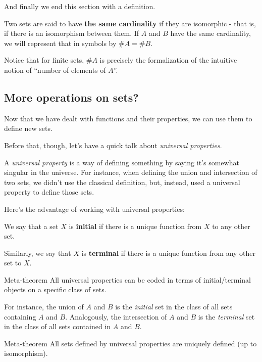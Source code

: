 And finally we end this section with a definition.

\begin{df}
	Two sets are said to have \textbf{the same cardinality} if they are isomorphic - that is, if there is an isomorphism between them. If $A$ and $B$ have the same cardinality, we will represent that in symbols by $\#A=\#B$.
\end{df}

\begin{rmk}
	Notice that for finite sets, $\#A$ is precisely the formalization of the intuitive notion of ``number of elements of $A$''.
\end{rmk}
\newpage
\subsection{More operations on sets?}

Now that we have dealt with functions and their properties, we can use them to define new sets.

Before that, though, let's have a quick talk about \textit{universal properties}.

A \textit{universal property} is a way of defining something by saying it's somewhat singular in the universe. For instance, when defining the union and intersection of two sets, we didn't use the classical definition, but, instead, used a universal property to define those sets.

Here's the advantage of working with universal properties:

\begin{df}
	We say that a set $X$ is \textbf{initial} if there is a unique function from $X$ to any other set.
	
	Similarly, we say that $X$ is \textbf{terminal} if there is a unique function from any other set to $X$.
\end{df}
\begin{blockenv}{Meta-theorem}
	All universal properties can be coded in terms of initial/terminal objects on a specific class of sets.
\end{blockenv}

For instance, the union of $A$ and $B$ is the \textit{initial} set in the class of all sets containing $A$ and $B$. Analogously, the intersection of $A$ and $B$ is the \textit{terminal} set in the class of all sets contained in $A$ and $B$.

\begin{blockenv}{Meta-theorem}
	All sets defined by universal properties are uniquely defined (up to isomorphism).
\end{blockenv}


